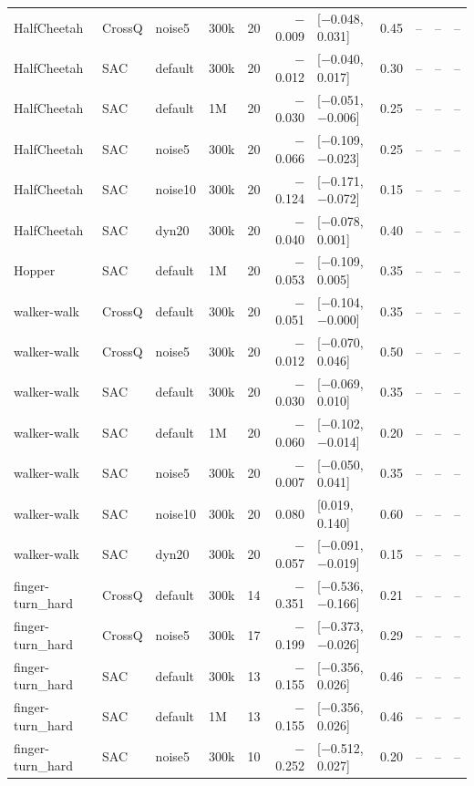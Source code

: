 \begin{longtable}{llllrrlrrrr}
HalfCheetah & CrossQ & noise5 & 300k & 20 & $-$0.009 & [$-$0.048, 0.031] & 0.45 & -- & -- & -- \\
HalfCheetah & SAC & default & 300k & 20 & $-$0.012 & [$-$0.040, 0.017] & 0.30 & -- & -- & -- \\
HalfCheetah & SAC & default & 1M & 20 & $-$0.030 & [$-$0.051, $-$0.006] & 0.25 & -- & -- & -- \\
HalfCheetah & SAC & noise5 & 300k & 20 & $-$0.066 & [$-$0.109, $-$0.023] & 0.25 & -- & -- & -- \\
HalfCheetah & SAC & noise10 & 300k & 20 & $-$0.124 & [$-$0.171, $-$0.072] & 0.15 & -- & -- & -- \\
HalfCheetah & SAC & dyn20 & 300k & 20 & $-$0.040 & [$-$0.078, 0.001] & 0.40 & -- & -- & -- \\
Hopper & SAC & default & 1M & 20 & $-$0.053 & [$-$0.109, 0.005] & 0.35 & -- & -- & -- \\
walker-walk & CrossQ & default & 300k & 20 & $-$0.051 & [$-$0.104, $-$0.000] & 0.35 & -- & -- & -- \\
walker-walk & CrossQ & noise5 & 300k & 20 & $-$0.012 & [$-$0.070, 0.046] & 0.50 & -- & -- & -- \\
walker-walk & SAC & default & 300k & 20 & $-$0.030 & [$-$0.069, 0.010] & 0.35 & -- & -- & -- \\
walker-walk & SAC & default & 1M & 20 & $-$0.060 & [$-$0.102, $-$0.014] & 0.20 & -- & -- & -- \\
walker-walk & SAC & noise5 & 300k & 20 & $-$0.007 & [$-$0.050, 0.041] & 0.35 & -- & -- & -- \\
walker-walk & SAC & noise10 & 300k & 20 & 0.080 & [0.019, 0.140] & 0.60 & -- & -- & -- \\
walker-walk & SAC & dyn20 & 300k & 20 & $-$0.057 & [$-$0.091, $-$0.019] & 0.15 & -- & -- & -- \\
finger-turn\_hard & CrossQ & default & 300k & 14 & $-$0.351 & [$-$0.536, $-$0.166] & 0.21 & -- & -- & -- \\
finger-turn\_hard & CrossQ & noise5 & 300k & 17 & $-$0.199 & [$-$0.373, $-$0.026] & 0.29 & -- & -- & -- \\
finger-turn\_hard & SAC & default & 300k & 13 & $-$0.155 & [$-$0.356, 0.026] & 0.46 & -- & -- & -- \\
finger-turn\_hard & SAC & default & 1M & 13 & $-$0.155 & [$-$0.356, 0.026] & 0.46 & -- & -- & -- \\
finger-turn\_hard & SAC & noise5 & 300k & 10 & $-$0.252 & [$-$0.512, 0.027] & 0.20 & -- & -- & -- \\

\end{longtable}
